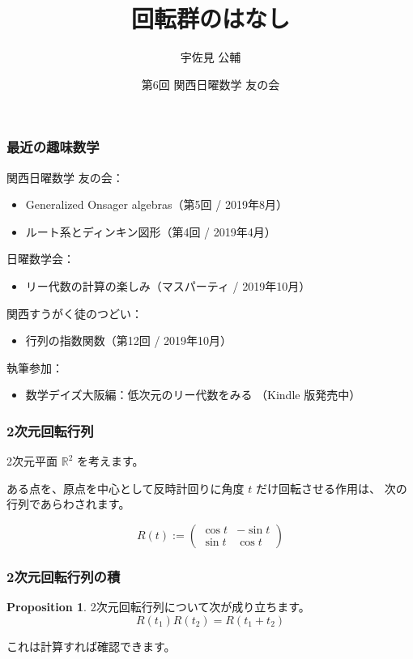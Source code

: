 \documentclass{beamer}
\title{回転群のはなし}
\author{宇佐見 公輔}
\date{第6回 関西日曜数学 友の会}
\theoremstyle{definition}
\newtheorem{proposition}{Proposition}
\begin{document}
\maketitle

\begin{frame}
    \frametitle{最近の趣味数学}

    関西日曜数学 友の会：
    \begin{itemize}
        \item Generalized Onsager algebras（第5回 / 2019年8月）
        \item ルート系とディンキン図形（第4回 / 2019年4月）
    \end{itemize}

    日曜数学会：
    \begin{itemize}
        \item リー代数の計算の楽しみ（マスパーティ / 2019年10月）
    \end{itemize}

    関西すうがく徒のつどい：
    \begin{itemize}
        \item 行列の指数関数（第12回 / 2019年10月）
    \end{itemize}

    執筆参加：
    \begin{itemize}
        \item 数学デイズ大阪編：低次元のリー代数をみる \scriptsize{（Kindle 版発売中）}
    \end{itemize}
\end{frame}

\begin{frame}
    \frametitle{2次元回転行列}

    2次元平面 \(\mathbb{R}^2\) を考えます。

    ある点を、原点を中心として反時計回りに角度 \(t\) だけ回転させる作用は、
    次の行列であらわされます。

    \begin{definition}
        \[
            R(t) :=
            \begin{pmatrix}
                \cos t & - \sin t \\
                \sin t & \cos t
            \end{pmatrix}
        \]
    \end{definition}
\end{frame}

\begin{frame}
    \frametitle{2次元回転行列の積}

    \begin{proposition}
        2次元回転行列について次が成り立ちます。
        \[
            R(t_1) R(t_2) = R(t_1 + t_2)
        \]
    \end{proposition}

    これは計算すれば確認できます。

\end{frame}
\end{document}
